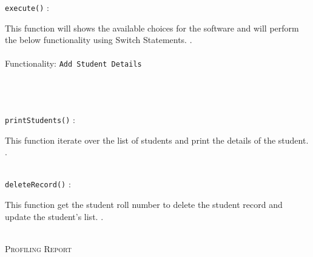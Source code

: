 \documentclass{report}
\begin{document}
\begin{flushleft}
\texttt{execute()}
\textsf{ : }
\end{flushleft}
\begin{flushright}
\hfill\begin{minipage}{0.85\linewidth}
	\textsf{	This function will shows the available choices for the software and will perform the below functionality using Switch Statements.	.} \\ \\
	\textsf{Functionality:  }
	\texttt{Add Student Details} \\ \\
	\textsf{ }
	 \\ \\
\end{minipage}
\end{flushright}

\begin{flushleft}
\texttt{printStudents()}
\textsf{ : }
\end{flushleft}
\begin{flushright}
\hfill\begin{minipage}{0.85\linewidth}
	\textsf{		This function iterate over the list of students and print the details of the student. .} \\ \\
	
	
\end{minipage}
\end{flushright}

\begin{flushleft}
\texttt{deleteRecord()}
\textsf{ : }
\end{flushleft}
\begin{flushright}
\hfill\begin{minipage}{0.85\linewidth}
	\textsf{		 This function get the student roll number to delete the student record and update the student’s list. .} \\ \\
	
\end{minipage}
\end{flushright}


\hfill

\begin{center}
	\textsc{\LARGE{Profiling Report}}
\end{center}

\hfill
\end{document}

